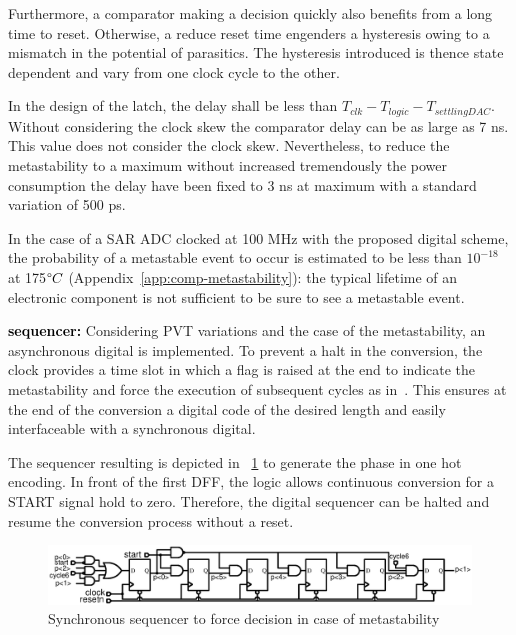 Furthermore, a comparator making a decision quickly also benefits from a long time to reset. Otherwise, a reduce reset time engenders a hysteresis owing to a mismatch in the potential of parasitics. The hysteresis introduced is thence state dependent and vary from one clock cycle to the other.

In the design of the latch, the delay shall be less than \(T_{clk} -  T_{logic} - T_{settlingDAC}\). Without considering the clock skew the comparator delay can be as large as 7 ns. This value does not consider the clock skew. Nevertheless, to reduce the metastability to a maximum without increased tremendously the power consumption the delay have been fixed to 3 ns at maximum with a standard variation of 500 ps.

In the case of a SAR ADC clocked at 100 MHz with the proposed digital scheme, the probability of a metastable event to occur is estimated to be less than $10^{-18}$ at 175$\degree C$ (Appendix~\ref{app:comp-metastability}): the typical lifetime of an electronic component is not sufficient to be sure to see a metastable event.

\textbf{\textcolor{black}{sequencer:}}
Considering PVT variations and the case of the metastability, an asynchronous digital is implemented. To prevent a halt in the conversion, the clock provides a time slot in which a flag is raised at the end to indicate the metastability and force the execution of subsequent cycles as in~\cite{Tung2016}. This ensures at the end of the conversion a digital code of the desired length and easily interfaceable with a synchronous digital.

The sequencer resulting is depicted in \figurename~\ref{fig:sar-async-sequencer} to generate the phase in one hot encoding. In front of the first DFF, the logic allows continuous conversion for a START signal hold to zero. Therefore, the digital sequencer can be halted and resume the conversion process without a reset.

\begin{figure}[htp]
	\centering
	\includegraphics[width=\textwidth]{Chapter4/Figs/sar-sequencer.ps}
	\caption{Synchronous sequencer to force decision in case of metastability}
	\label{fig:sar-async-sequencer}
\end{figure}

